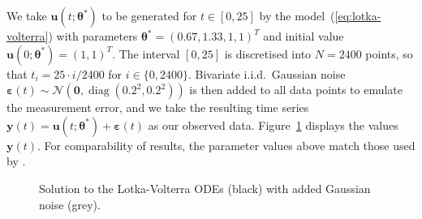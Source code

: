 \documentclass[11pt,a4paper]{report}
\DeclareMathOperator{\diag}{diag}
\begin{document}
We take $\mathbf{u}(t;\pmb{\theta}^*)$ to be generated for $t \in [0, 25]$ by the model~(\ref{eq:lotka-volterra}) with parameters $\pmb{\theta}^* = (0.67, 1.33, 1, 1)^T$ and initial value $\mathbf{u}(0; \pmb{\theta}^*) = (1, 1)^T$. The interval $[0, 25]$ is discretised into $N = 2400$ points, so that $t_i = 25 \cdot i / 2400$ for $i \in \{0, 2400\}$. Bivariate i.i.d.\ Gaussian noise $\pmb{\varepsilon}(t) \sim \mathcal{N}\left( \mathbf{0}, \diag(0.2^2, 0.2^2) \right)$ is then added to all data points to emulate the measurement error, and we take the resulting time series $\mathbf{y}(t) = \mathbf{u}(t;\pmb{\theta}^*) + \pmb{\varepsilon}(t)$ as our observed data. Figure~\ref{fig:lotka-volterra:data} displays the values $\mathbf{y}(t)$. For comparability of results, the parameter values above match those used by \cite{riabizOptimalThinningMCMC2022}. 

\begin{figure}[h]
\centering
{}
\caption{Solution to the Lotka-Volterra ODEs (black) with added Gaussian noise (grey).
\label{fig:lotka-volterra:data}}
\end{figure}
\end{document}
